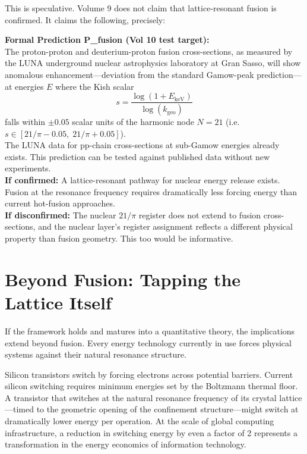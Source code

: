 \documentclass[11pt, letterpaper, openany]{book}
\begin{document}
This is speculative. Volume 9 does not claim that lattice-resonant fusion is
confirmed. It claims the following, precisely:

\begin{predictionbox}
\textbf{Formal Prediction P\_fusion (Vol 10 test target):}\\[0.5em]
The proton-proton and deuterium-proton fusion cross-sections, as measured by the
LUNA underground nuclear astrophysics laboratory at Gran Sasso, will show
anomalous enhancement---deviation from the standard Gamow-peak prediction---at
energies $E$ where the Kish scalar
\[
s = \frac{\log(1 + E_\text{keV})}{\log(k_\text{geo})}
\]
falls within $\pm 0.05$ scalar units of the harmonic node $N=21$
(i.e.\ $s \in [21/\pi - 0.05,\; 21/\pi + 0.05]$).\\[0.5em]
The LUNA data for pp-chain cross-sections at sub-Gamow energies already exists.
This prediction can be tested against published data without new experiments.\\[0.5em]
\textbf{If confirmed:} A lattice-resonant pathway for nuclear energy release exists.
Fusion at the resonance frequency requires dramatically less forcing energy than
current hot-fusion approaches.\\[0.5em]
\textbf{If disconfirmed:} The nuclear $21/\pi$ register does not extend to fusion
cross-sections, and the nuclear layer's register assignment reflects a different
physical property than fusion geometry. This too would be informative.
\end{predictionbox}

\section{Beyond Fusion: Tapping the Lattice Itself}

If the framework holds and matures into a quantitative theory, the implications
extend beyond fusion. Every energy technology currently in use forces physical
systems against their natural resonance structure.

Silicon transistors switch by forcing electrons across potential barriers. Current
silicon switching requires minimum energies set by the Boltzmann thermal floor.
A transistor that switches at the natural resonance frequency of its crystal
lattice---timed to the geometric opening of the confinement structure---might
switch at dramatically lower energy per operation. At the scale of global
computing infrastructure, a reduction in switching energy by even a factor of 2
represents a transformation in the energy economics of information technology.
\end{document}
